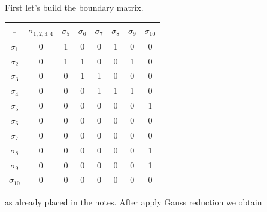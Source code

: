 First let's build the boundary matrix. 

\begin{center}
    \begin{tabular}{|c|c|c|c|c|c|c|c|}
        \hline
        -             & $\sigma_{1,2,3,4}$ & $\sigma_5$ & $\sigma_6$ & $\sigma_7$ & $\sigma_8$ & $\sigma_9$ & $\sigma_{10}$ \\ \hline
        $\sigma_1$    & 0                  & 1          & 0          & 0          & 1          & 0          & 0             \\ \hline
        $\sigma_2$    & 0                  & 1          & 1          & 0          & 0          & 1          & 0             \\ \hline
        $\sigma_3$    & 0                  & 0          & 1          & 1          & 0          & 0          & 0             \\ \hline
        $\sigma_4$    & 0                  & 0          & 0          & 1          & 1          & 1          & 0             \\ \hline
        $\sigma_5$    & 0                  & 0          & 0          & 0          &    0        & 0          & 1             \\ \hline
        $\sigma_6$    & 0                  & 0          & 0          & 0          & 0          & 0          & 0             \\ \hline
        $\sigma_7$    & 0                  & 0          & 0          & 0          & 0          & 0          & 0             \\ \hline
        $\sigma_8$    & 0                  & 0          & 0          & 0          & 0          & 0          & 1             \\ \hline
        $\sigma_9$    & 0                  & 0          & 0          & 0          & 0          & 0          & 1             \\ \hline
        $\sigma_{10}$ & 0                  & 0          & 0          & 0          & 0          & 0          & 0             \\ \hline
    \end{tabular}    
\end{center}

as already placed in the notes. After apply Gauss reduction we obtain 

